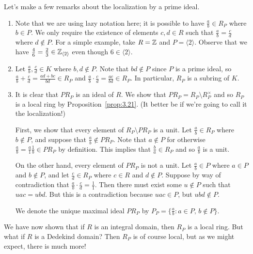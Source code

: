 Let's make a few remarks about the localization by a prime ideal. 
\begin{enumerate}[(1)]
    \item Note that we are using lazy notation here; it is possible to have 
    $\frac{a}{b} \in R_P$ where $b \in P$. We only require the existence 
    of elements $c, d \in R$ such that $\frac{a}{b} = \frac{c}{d}$ where $d \notin P$. 
    For a simple example, take $R = \mathbb{Z}$ and $P = \langle 2 \rangle$. 
    Observe that we have $\frac{4}{6} = \frac{2}{3} \in \mathbb{Z}_{\langle 2 \rangle}$
    even though $6 \in \langle 2 \rangle$. 

    \item Let $\frac{a}{b}, \frac{c}{d} \in K$ where $b, d \notin P$. Note that 
    $bd \notin P$ since $P$ is a prime ideal, so $\frac{a}{b} + \frac{c}{d} 
    = \frac{ad+bc}{bd} \in R_P$ and $\frac{a}{b} \cdot \frac{c}{d} = \frac{ac}{bd} \in R_P$. 
    In particular, $R_P$ is a subring of $K$. 

    \item It is clear that $PR_P$ is an ideal of $R$. We show that 
    $PR_P = R_P \setminus R_P^\times$ and so $R_P$ is a local ring by 
    Proposition~\ref{prop:3.21}. 
    (It better be if we're going to call it the localization!)
    
    First, we show that every element of $R_P \setminus PR_P$ is a unit. 
    Let $\frac{a}{b} \in R_P$ where $b \notin P$, and suppose that $\frac{a}{b} 
    \notin PR_P$. Note that $a \notin P$ for otherwise $\frac{a}{b} = \frac{a}{1} 
    \frac{1}{b} \in PR_P$ by definition. This implies that $\frac{b}{a} \in R_P$ 
    and so $\frac{a}{b}$ is a unit. 

    On the other hand, every element of $PR_P$ is not a unit. Let 
    $\frac{a}{b} \in P$ where $a \in P$ and $b \notin P$, and let 
    $\frac{c}{d} \in R_P$ where $c \in R$ and $d \notin P$. Suppose 
    by way of contradiction that $\frac{a}{b} \cdot \frac{c}{d} = \frac{1}{1}$.
    Then there must exist some $u \notin P$ such that $uac = ubd$. But this is 
    a contradiction because $uac \in P$, but $ubd \notin P$. 

    We denote the unique maximal ideal $PR_P$ by $P_P = 
    \{\frac{a}{b} : a \in P,\, b \notin P\}$. 
\end{enumerate}

We have now shown that if $R$ is an integral domain, then $R_P$ is a local ring. 
But what if $R$ is a Dedekind domain? Then $R_P$ is of course local, but 
as we might expect, there is much more!

